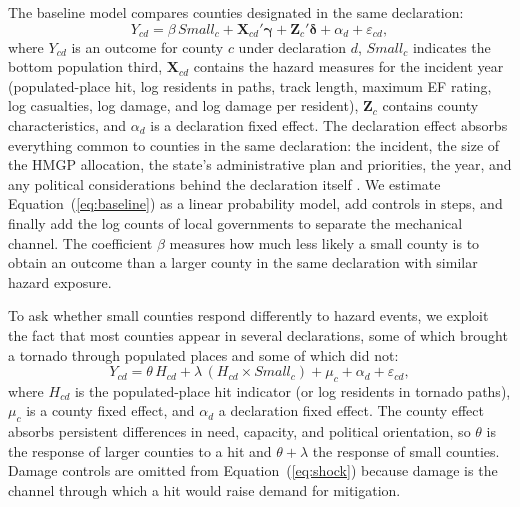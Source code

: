 \documentclass[12pt]{article}
\begin{document}
The baseline model compares counties designated in the same declaration:
\begin{equation}
Y_{cd} = \beta\, \mathit{Small}_c + \mathbf{X}_{cd}'\boldsymbol{\gamma} + \mathbf{Z}_c'\boldsymbol{\delta} + \alpha_d + \varepsilon_{cd},
\label{eq:baseline}
\end{equation}
where $Y_{cd}$ is an outcome for county $c$ under declaration $d$, $\mathit{Small}_c$ indicates the bottom population third, $\mathbf{X}_{cd}$ contains the hazard measures for the incident year (populated-place hit, log residents in paths, track length, maximum EF rating, log casualties, log damage, and log damage per resident), $\mathbf{Z}_c$ contains county characteristics, and $\alpha_d$ is a declaration fixed effect. The declaration effect absorbs everything common to counties in the same declaration: the incident, the size of the HMGP allocation, the state's administrative plan and priorities, the year, and any political considerations behind the declaration itself \parencite{garrett2003political,reeves2011political}. We estimate Equation~(\ref{eq:baseline}) as a linear probability model, add controls in steps, and finally add the log counts of local governments to separate the mechanical channel. The coefficient $\beta$ measures how much less likely a small county is to obtain an outcome than a larger county in the same declaration with similar hazard exposure.

To ask whether small counties respond differently to hazard events, we exploit the fact that most counties appear in several declarations, some of which brought a tornado through populated places and some of which did not:
\begin{equation}
Y_{cd} = \theta\, H_{cd} + \lambda\, (H_{cd} \times \mathit{Small}_c) + \mu_c + \alpha_d + \varepsilon_{cd},
\label{eq:shock}
\end{equation}
where $H_{cd}$ is the populated-place hit indicator (or log residents in tornado paths), $\mu_c$ is a county fixed effect, and $\alpha_d$ a declaration fixed effect. The county effect absorbs persistent differences in need, capacity, and political orientation, so $\theta$ is the response of larger counties to a hit and $\theta + \lambda$ the response of small counties. Damage controls are omitted from Equation~(\ref{eq:shock}) because damage is the channel through which a hit would raise demand for mitigation.
\end{document}
